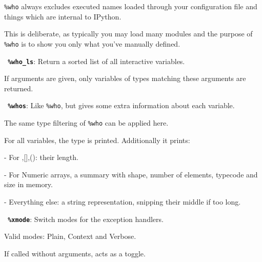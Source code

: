         \texttt{\%who} always excludes executed names loaded through your configuration
        file and things which are internal to IPython.

        This is deliberate, as typically you may load many modules and the
        purpose of \texttt{\%who} is to show you only what you've manually defined.

\bigskip
\texttt{\textbf{ \%who\_ls}}:
	Return a sorted list of all interactive variables.

        If arguments are given, only variables of types matching these
        arguments are returned.

\bigskip
\texttt{\textbf{ \%whos}}:
	Like \texttt{\%who}, but gives some extra information about each variable.

        The same type filtering of \texttt{\%who} can be applied here.

        For all variables, the type is printed. Additionally it prints:
        
          - For {},[],(): their length.

          - For Numeric arrays, a summary with shape, number of elements,
          typecode and size in memory.

          - Everything else: a string representation, snipping their middle if
          too long.

\bigskip
\texttt{\textbf{ \%xmode}}:
	Switch modes for the exception handlers.

        Valid modes: Plain, Context and Verbose.

        If called without arguments, acts as a toggle.

